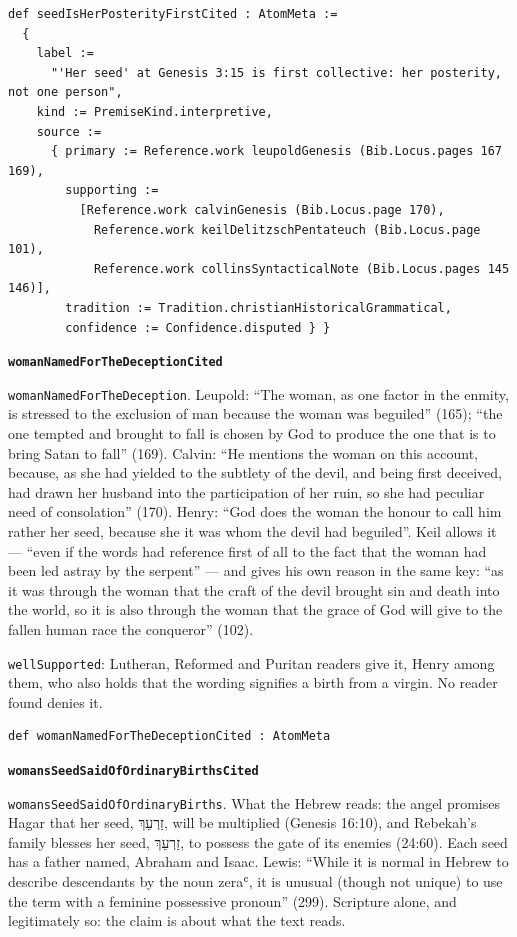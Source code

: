 \documentclass[11pt]{article}
\begin{document}
{\small\begin{verbatim}
def seedIsHerPosterityFirstCited : AtomMeta :=
  {
    label :=
      "'Her seed' at Genesis 3:15 is first collective: her posterity, not one person",
    kind := PremiseKind.interpretive,
    source :=
      { primary := Reference.work leupoldGenesis (Bib.Locus.pages 167 169),
        supporting :=
          [Reference.work calvinGenesis (Bib.Locus.page 170),
            Reference.work keilDelitzschPentateuch (Bib.Locus.page 101),
            Reference.work collinsSyntacticalNote (Bib.Locus.pages 145 146)],
        tradition := Tradition.christianHistoricalGrammatical,
        confidence := Confidence.disputed } }
\end{verbatim}}
\par\medskip\noindent\textbf{\texttt{woman\allowbreak{}Named\allowbreak{}For\allowbreak{}The\allowbreak{}Deception\allowbreak{}Cited}}\par\nobreak\noindent
\texttt{woman\allowbreak{}Named\allowbreak{}For\allowbreak{}The\allowbreak{}Deception}. Leupold: “The woman, as one factor in the enmity, is stressed to the exclusion of man because the woman was beguiled” (165); “the one tempted and brought to fall is chosen by God to produce the one that is to bring Satan to fall” (169). Calvin: “He mentions the woman on this account, because, as she had yielded to the subtlety of the devil, and being first deceived, had drawn her husband into the participation of her ruin, so she had peculiar need of consolation” (170). Henry: “God does the woman the honour to call him rather her seed, because she it was whom the devil had beguiled”. Keil allows it — “even if the words had reference first of all to the fact that the woman had been led astray by the serpent” — and gives his own reason in the same key: “as it was through the woman that the craft of the devil brought sin and death into the world, so it is also through the woman that the grace of God will give to the fallen human race the conqueror” (102).

\texttt{well\allowbreak{}Supported}: Lutheran, Reformed and Puritan readers give it, Henry among them, who also holds that the wording signifies a birth from a virgin. No reader found denies it.

{\small\begin{verbatim}
def womanNamedForTheDeceptionCited : AtomMeta
\end{verbatim}}
\par\medskip\noindent\textbf{\texttt{womans\allowbreak{}Seed\allowbreak{}Said\allowbreak{}Of\allowbreak{}Ordinary\allowbreak{}Births\allowbreak{}Cited}}\par\nobreak\noindent
\texttt{womans\allowbreak{}Seed\allowbreak{}Said\allowbreak{}Of\allowbreak{}Ordinary\allowbreak{}Births}. What the Hebrew reads: the angel promises Hagar that her seed, זַרְעֵךְ, will be multiplied (Genesis 16:10), and Rebekah’s family blesses her seed, זַרְעֵךְ, to possess the gate of its enemies (24:60). Each seed has a father named, Abraham and Isaac. Lewis: “While it is normal in Hebrew to describe descendants by the noun zeraʿ, it is unusual (though not unique) to use the term with a feminine possessive pronoun” (299). Scripture alone, and legitimately so: the claim is about what the text reads.
\end{document}
